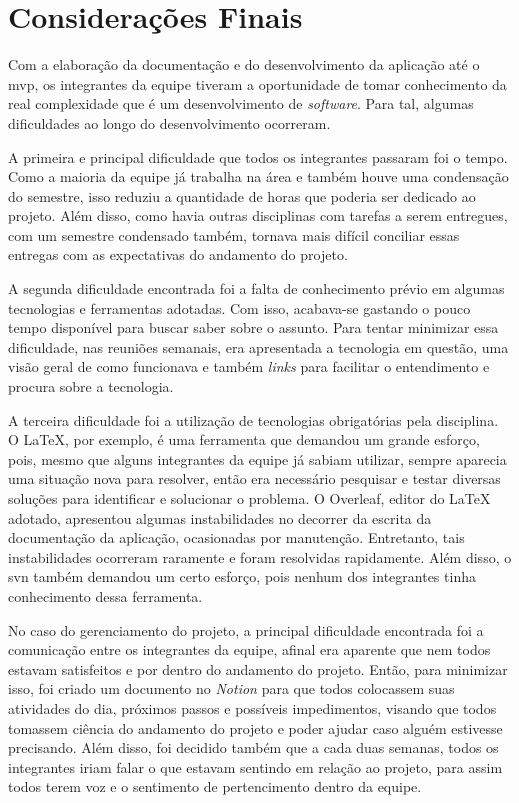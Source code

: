 \chapter[Considerações Finais]{Considerações Finais}

Com a elaboração da documentação e do desenvolvimento da aplicação até o \ac{mvp}, os integrantes da equipe tiveram a oportunidade de tomar conhecimento da real complexidade que é um desenvolvimento de \textit{\gls{software}}. Para tal, algumas dificuldades ao longo do desenvolvimento ocorreram. 

A primeira e principal dificuldade que todos os integrantes passaram foi o tempo. Como a maioria da equipe já trabalha na área e também houve uma condensação do semestre, isso reduziu a quantidade de horas que poderia ser dedicado ao projeto. Além disso, como havia outras disciplinas com tarefas a serem entregues, com um semestre condensado também, tornava mais difícil conciliar essas entregas com as expectativas do andamento do projeto.

A segunda dificuldade encontrada foi a falta de conhecimento prévio em algumas tecnologias e ferramentas adotadas. Com isso, acabava-se gastando o pouco tempo disponível para buscar saber sobre o assunto. Para tentar minimizar essa dificuldade, nas reuniões semanais, era apresentada a tecnologia em questão, uma visão geral de como funcionava e também \textit{links} para facilitar o entendimento e procura sobre a tecnologia.

A terceira dificuldade foi a utilização de tecnologias obrigatórias pela disciplina. O LaTeX, por exemplo, é uma ferramenta que demandou um grande esforço, pois, mesmo que alguns integrantes da equipe já sabiam utilizar, sempre aparecia uma situação nova para resolver, então era necessário pesquisar e testar diversas soluções para identificar e solucionar o problema. O Overleaf, editor do LaTeX adotado, apresentou algumas instabilidades no decorrer da escrita da documentação da aplicação, ocasionadas por manutenção. Entretanto, tais instabilidades ocorreram raramente e foram resolvidas rapidamente. Além disso, o \gls{svn} também demandou um certo esforço, pois nenhum dos integrantes tinha conhecimento dessa ferramenta.

No caso do gerenciamento do projeto, a principal dificuldade encontrada foi a comunicação entre os integrantes da equipe, afinal era aparente que nem todos estavam satisfeitos e por dentro do andamento do projeto. Então, para minimizar isso, foi criado um documento no \textit{Notion} para que todos colocassem suas atividades do dia, próximos passos e possíveis impedimentos, visando que todos tomassem ciência do andamento do projeto e poder ajudar caso alguém estivesse precisando. Além disso, foi decidido também que a cada duas semanas, todos os integrantes iriam falar o que estavam sentindo em relação ao projeto, para assim todos terem voz e o sentimento de pertencimento dentro da equipe.

